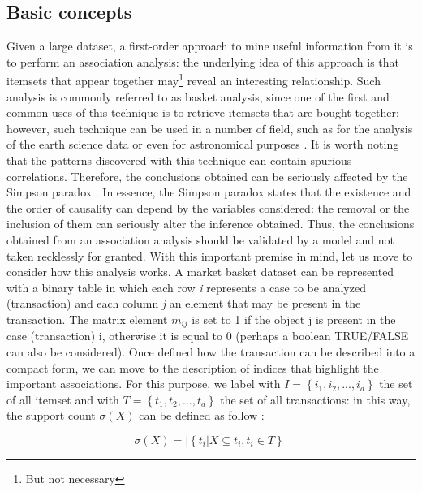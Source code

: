 \documentclass[12pt,%
               a4paper,%
               oneside,openany,%
               titlepage,%
               headinclude,footinclude,%
               BCOR5mm,%
               cleardoublepage=empty,%
               tablecaptionabove,%
               floatperchapter,
               ]{scrreprt}                 %
\begin{document}
\subsection{Basic concepts}

Given a large dataset, a first-order approach to mine useful information from it is to perform an association analysis: the underlying idea of this approach is that itemsets that appear together may\footnote{But not necessary} reveal an interesting relationship. Such analysis is commonly referred to as basket analysis, since one of the first and common uses of this technique is to retrieve itemsets that are bought together; however, such technique can be used in a number of field, such as for the analysis of the earth science data or even for astronomical purposes \cite{borah2019rare}. It is worth noting that the patterns discovered with this technique can contain spurious correlations. Therefore, the conclusions obtained can be seriously affected by the Simpson paradox \cite{simpson1951interpretation,blyth1972simpson}. In essence, the Simpson paradox states that the existence and the order of causality can depend by the variables considered: the removal or the inclusion of them can seriously alter the inference obtained. Thus, the conclusions obtained from an association analysis should be validated by a model and not taken recklessly for granted. With this important premise in mind, let us move to consider how this analysis works. A market basket dataset can be represented with a binary table in which each row \textit{i} represents a case to be analyzed (transaction) and each column \textit{j} an element that may be present in the transaction. The matrix element $ m_{ij} $ is set to 1 if the object j is present in the case (transaction) i, otherwise it is equal to 0 (perhaps a boolean TRUE/FALSE can also be considered). Once defined how the transaction can be described into a compact form, we can move to the description of indices that highlight the important associations. For this purpose, we label with $I=\left\lbrace i_{1},i_{2},...,i_{d} \right\rbrace$ the set of all itemset and with $T=\left\lbrace t_{1},t_{2},...,t_{d} \right\rbrace$ the set of all transactions: in this way, the support count $\sigma(X)$ can be defined as follow \cite{tan2019introduction}:

\begin{equation}
\sigma(X)= \left| \left\lbrace t_{i} | X \subseteq t_{i}, t_{i} \in T \right\rbrace \right|
\end{equation}
\end{document}
